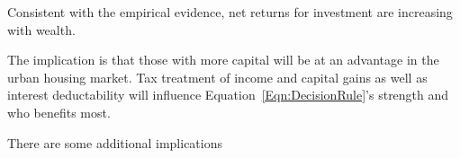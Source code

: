 Consistent with the empirical evidence, net returns for investment are increasing with wealth. 
%
%
%
%

The implication is that those with more capital will be at an advantage in the urban housing  market. Tax treatment of income and capital gains as well as interest deductability will influence Equation~\ref{Eqn:DecisionRule}'s strength and who benefits most. 

There are some additional implications


